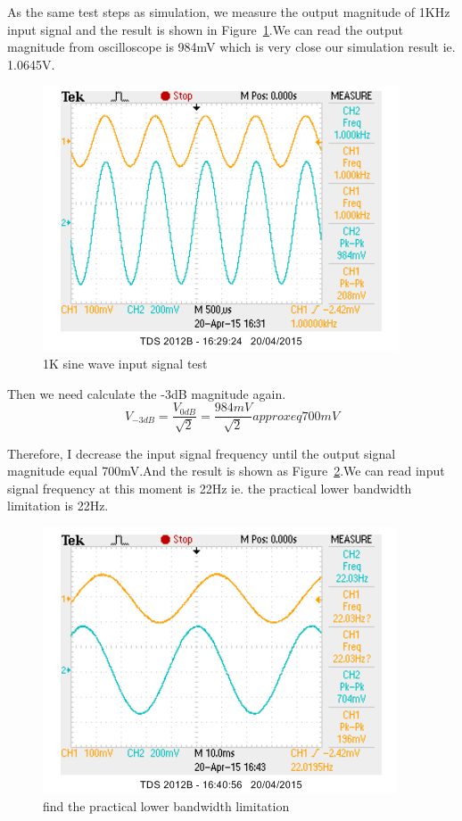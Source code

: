 As the same test steps as simulation, we measure the output magnitude of 1KHz input signal and the result is shown in Figure~\ref{fig:1K sine wave input signal test}.We can read the output magnitude from oscilloscope is 984mV which is very close our simulation result ie. 1.0645V.

\begin{figure}[htbp]
\centering
\includegraphics[scale=1]{"../Photo/Chap7/1ksine"}
\caption{1K sine wave input signal test}
\label{fig:1K sine wave input signal test}
\end{figure}

Then we need calculate the -3dB magnitude again.
\[ V_{-3dB}=\frac{V_{0dB}}{\sqrt{2}}=\frac{984mV}{\sqrt{2}}approxeq 700 mV\]

Therefore, I decrease the input signal frequency until the output signal magnitude equal 700mV.And the result is shown as Figure~\ref{fig:find the practical lower bandwidth limitation}.We can read input signal frequency at this moment is 22Hz ie. the practical lower bandwidth limitation is 22Hz.
\begin{figure}[htbp]
\centering
\includegraphics[scale=1]{"../Photo/Chap7/lower band"}
\caption{find the practical lower bandwidth limitation}
\label{fig:find the practical lower bandwidth limitation}
\end{figure}

